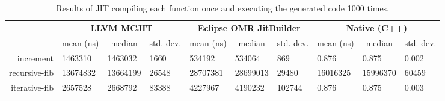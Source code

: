 \begin{table*}[t]
  \begin{tabular}{|r|l|l|l|l|l|l|l|l|l|}
  \hline
  
  \multicolumn{1}{|l|}{\multirow{2}{*}{}} 
  & \multicolumn{3}{c|}{\textbf{LLVM MCJIT}}                                                                                    
  & \multicolumn{3}{c|}{\textbf{Eclipse OMR JitBuilder}}                                                                
  & \multicolumn{3}{c|}{\textbf{Native (C++)}}                                                                              
  \\ \cline{2-10}
  
  \multicolumn{1}{|c|}{\textbf{Program}}  
  & \multicolumn{1}{c|}{mean (ns)}  %
  & \multicolumn{1}{c|}{median}  
  & \multicolumn{1}{c|}{std. dev.}                     
  & \multicolumn{1}{c|}{mean (ns)}  %
  & \multicolumn{1}{c|}{median}  
  & \multicolumn{1}{c|}{std. dev.}           
  & \multicolumn{1}{c|}{mean (ns)}  %
  & \multicolumn{1}{c|}{median}  
  & \multicolumn{1}{c|}{std. dev.}                        
  \\ \hline
  
  increment                               
  & \num{1463310} %
  & \num{1463032}                
  & \num{1660}                                        
  & \num{534192}  %
  & \num{534064}                 
  & \num{869}                                
  & \num{0.876}    %
  & \num{0.875}                   
  & \num{0.002}                                
  \\ \hline
  
  recursive-fib                           
  & \num{13674832}  %
  & \num{13664199}               
  & \num{26548}                                        
  & \num{28707381}  %
  & \num{28699013}               
  & \num{29480}                               
  & \num{16016325}  %
  & \num{15996370}               
  & \num{60459}  
  \\ \hline
  
  iterative-fib                           
  & \num{2657528}   %
  & \num{2668792}                
  & \num{83388}                                        
  & \num{4227967}   %
  & \num{4190232}                
  & \num{102744}                              
  & \num{0.876}     %
  & \num{0.875}                  
  & \num{0.003}                                
  \\ \hline
  \end{tabular}
  \caption{Results of JIT compiling each function once and executing the generated code 1000 times.}
  \label{tab:1k_time_with_one_compile}
\end{table*}

